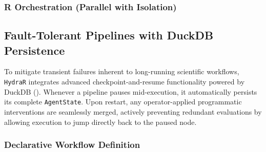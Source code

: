 \documentclass[
]{article}
\newenvironment{Shaded}{}{}
\newcommand{\AttributeTok}[1]{\textcolor[rgb]{0.49,0.56,0.16}{#1}}
\newcommand{\CharTok}[1]{\textcolor[rgb]{0.25,0.44,0.63}{#1}}
\newcommand{\ConstantTok}[1]{\textcolor[rgb]{0.53,0.00,0.00}{#1}}
\newcommand{\FunctionTok}[1]{\textcolor[rgb]{0.02,0.16,0.49}{#1}}
\newcommand{\KeywordTok}[1]{\textcolor[rgb]{0.00,0.44,0.13}{\textbf{#1}}}
\newcommand{\NormalTok}[1]{#1}
\newcommand{\OtherTok}[1]{\textcolor[rgb]{0.00,0.44,0.13}{#1}}
\newcommand{\SpecialCharTok}[1]{\textcolor[rgb]{0.25,0.44,0.63}{#1}}
\newcommand{\StringTok}[1]{\textcolor[rgb]{0.25,0.44,0.63}{#1}}
\begin{document}
\subsubsection{R Orchestration (Parallel with
Isolation)}\label{r-orchestration-parallel-with-isolation}

\begin{Shaded}
\end{Shaded}

\subsection{Fault-Tolerant Pipelines with DuckDB
Persistence}\label{fault-tolerant-pipelines-with-duckdb-persistence}

To mitigate transient failures inherent to long-running scientific
workflows, \texttt{HydraR} integrates advanced checkpoint-and-resume
functionality powered by DuckDB (). Whenever a pipeline pauses mid-execution, it
automatically persists its complete \texttt{AgentState}. Upon restart,
any operator-applied programmatic interventions are seamlessly merged,
actively preventing redundant evaluations by allowing execution to jump
directly back to the paused node.

\subsubsection{Declarative Workflow
Definition}\label{declarative-workflow-definition}

\begin{Shaded}
\end{Shaded}
\end{document}
